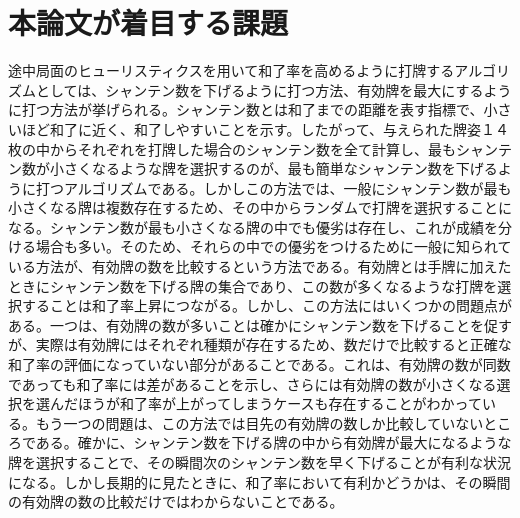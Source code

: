 \section{本論文が着目する課題}
途中局面のヒューリスティクスを用いて和了率を高めるように打牌するアルゴリズムとしては、シャンテン数を下げるように打つ方法、有効牌を最大にするように打つ方法が挙げられる。シャンテン数とは和了までの距離を表す指標で、小さいほど和了に近く、和了しやすいことを示す。したがって、与えられた牌姿１４枚の中からそれぞれを打牌した場合のシャンテン数を全て計算し、最もシャンテン数が小さくなるような牌を選択するのが、最も簡単なシャンテン数を下げるように打つアルゴリズムである。しかしこの方法では、一般にシャンテン数が最も小さくなる牌は複数存在するため、その中からランダムで打牌を選択することになる。シャンテン数が最も小さくなる牌の中でも優劣は存在し、これが成績を分ける場合も多い。そのため、それらの中での優劣をつけるために一般に知られている方法が、有効牌の数を比較するという方法である。有効牌とは手牌に加えたときにシャンテン数を下げる牌の集合であり、この数が多くなるような打牌を選択することは和了率上昇につながる。しかし、この方法にはいくつかの問題点がある。一つは、有効牌の数が多いことは確かにシャンテン数を下げることを促すが、実際は有効牌にはそれぞれ種類が存在するため、数だけで比較すると正確な和了率の評価になっていない部分があることである。これは、有効牌の数が同数であっても和了率には差があることを示し、さらには有効牌の数が小さくなる選択を選んだほうが和了率が上がってしまうケースも存在することがわかっている。もう一つの問題は、この方法では目先の有効牌の数しか比較していないところである。確かに、シャンテン数を下げる牌の中から有効牌が最大になるような牌を選択することで、その瞬間次のシャンテン数を早く下げることが有利な状況になる。しかし長期的に見たときに、和了率において有利かどうかは、その瞬間の有効牌の数の比較だけではわからないことである。


